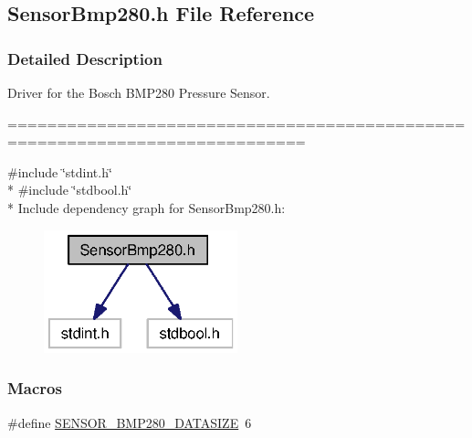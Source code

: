 \subsection{Sensor\+Bmp280.\+h File Reference}
\label{_sensor_bmp280_8h}


\subsubsection{Detailed Description}
Driver for the Bosch B\+M\+P280 Pressure Sensor. 

============================================================================



{\ttfamily \#include \char`\"{}stdint.\+h\char`\"{}}\\*
{\ttfamily \#include \char`\"{}stdbool.\+h\char`\"{}}\\*
Include dependency graph for Sensor\+Bmp280.\+h\+:
\nopagebreak
\begin{figure}[H]
\begin{center}
\leavevmode
\includegraphics[width=159pt]{_sensor_bmp280_8h__incl}
\end{center}
\end{figure}
\subsubsection*{Macros}
\begin{DoxyCompactItemize}
\item 
\#define \hyperlink{_sensor_bmp280_8h_ad917f5bcd2a29d9179fdbb014e7bdfa1}{S\+E\+N\+S\+O\+R\+\_\+\+B\+M\+P280\+\_\+\+D\+A\+T\+A\+S\+I\+Z\+E}~6
\end{DoxyCompactItemize}
